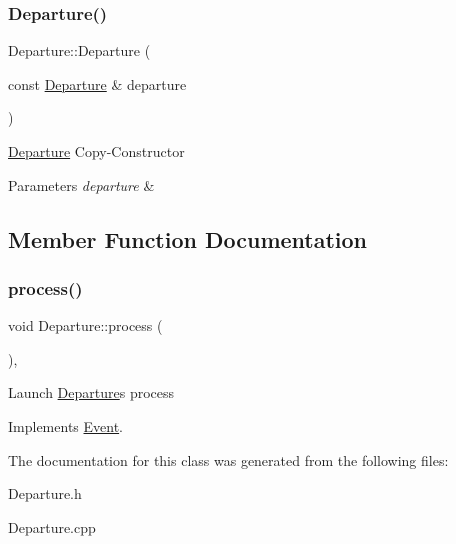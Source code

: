 \subsubsection{\texorpdfstring{Departure()}{Departure()}\hspace{0.1cm}{\footnotesize\ttfamily [2/2]}}
{\footnotesize\ttfamily Departure\+::\+Departure (\begin{DoxyParamCaption}\item[{const \hyperlink{classDeparture}{Departure} \&}]{departure }\end{DoxyParamCaption})}

\hyperlink{classDeparture}{Departure} Copy-\/\+Constructor 
\begin{DoxyParams}{Parameters}
{\em departure} & \\
\hline
\end{DoxyParams}


\subsection{Member Function Documentation}
\mbox{\label{classDeparture_a241611bdf4255d2ba868d58128dddc68}} 
\subsubsection{\texorpdfstring{process()}{process()}}
{\footnotesize\ttfamily void Departure\+::process (\begin{DoxyParamCaption}{ }\end{DoxyParamCaption})\hspace{0.3cm}{\ttfamily [override]}, {\ttfamily [virtual]}}

Launch \hyperlink{classDeparture}{Departure}\textquotesingle{}s process 

Implements \hyperlink{classEvent_af1940e82c4da67c8119f0dfe026949b4}{Event}.



The documentation for this class was generated from the following files\+:\begin{DoxyCompactItemize}
\item 
Departure.\+h\item 
Departure.\+cpp\end{DoxyCompactItemize}
